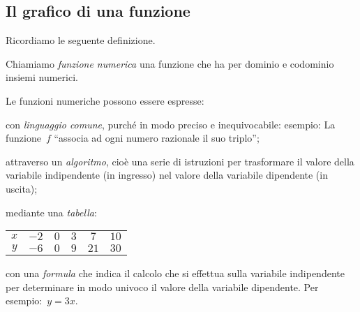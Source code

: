 \begin{comment}
\(B\left(2;-\frac{1}{2}\right)\).
% 
\(B\left(2;-\frac{1}{2}\right)\), 
% 
% 
% 
risolutiva}:~\(x_{M}=\frac{x_{A}+x_{B}}{2}=\frac{-{\frac{3}{4}}+2}{2}=\frac{5}
{8
}
% 


\end{comment}

\subsection{Il grafico di una funzione}
\label{subsec:fun_grafico}

Ricordiamo le seguente definizione.
\begin{definizione}
Chiamiamo \emph{funzione numerica} una funzione che ha per dominio e 
codominio insiemi numerici.
\end{definizione}
Le funzioni numeriche possono essere espresse:
\begin{itemize*}
\item con \emph{linguaggio comune}, purché in modo preciso e inequivocabile: 
esempio: La funzione~\(f\)
 ``associa ad ogni numero razionale il suo triplo'';
\item attraverso un \emph{algoritmo}, 
cioè una serie di istruzioni per trasformare il valore della variabile 
indipendente (in ingresso) nel valore della variabile dipendente (in uscita);
\item mediante una \emph{tabella}:
 \begin{center}
\begin{tabular}{cccccc}
 \toprule
 \(x\) & \(-2\) & \(0\) & \(3\) & \(7\) & \(10\) \\
 \(y\) & \(-6\) & \(0\) & \(9\) & \(21\) & \(30\)\\
 \bottomrule
 \end{tabular}
 \end{center}
\item con una \emph{formula} che indica il calcolo che si effettua sulla 
variabile indipendente per determinare in modo univoco
il valore della variabile dipendente. Per esempio:~\(y=3x\).
\end{itemize*}
% 

